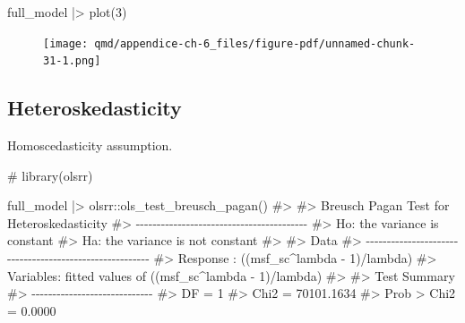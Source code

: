 \documentclass[
  12pt,
  a4paper,
  oneside]{tesesusp}
\newenvironment{Shaded}{\begin{snugshade}}{\end{snugshade}}
\newcommand{\CommentTok}[1]{\textcolor[rgb]{0.37,0.37,0.37}{#1}}
\newcommand{\DecValTok}[1]{\textcolor[rgb]{0.68,0.00,0.00}{#1}}
\newcommand{\FunctionTok}[1]{\textcolor[rgb]{0.28,0.35,0.67}{#1}}
\newcommand{\NormalTok}[1]{\textcolor[rgb]{0.00,0.23,0.31}{#1}}
\newcommand{\SpecialCharTok}[1]{\textcolor[rgb]{0.37,0.37,0.37}{#1}}
\begin{document}
\begin{Shaded}
\begin{Highlighting}[numbers=left,,]
\NormalTok{full\_model }\SpecialCharTok{|\textgreater{}} \FunctionTok{plot}\NormalTok{(}\DecValTok{3}\NormalTok{)}
\end{Highlighting}
\end{Shaded}

\begin{figure}[H]

{\centering \texttt{[image: qmd/appendice-ch-6\_files/figure-pdf/unnamed-chunk-31-1.png]}

}

\end{figure}

\hypertarget{heteroskedasticity-1}{%
\subsection{Heteroskedasticity}\label{heteroskedasticity-1}}

Homoscedasticity assumption.

\begin{Shaded}
\begin{Highlighting}[numbers=left,,]
\CommentTok{\# library(olsrr)}

\NormalTok{full\_model }\SpecialCharTok{|\textgreater{}}\NormalTok{ olsrr}\SpecialCharTok{::}\FunctionTok{ols\_test\_breusch\_pagan}\NormalTok{()}
\CommentTok{\#\textgreater{} }
\CommentTok{\#\textgreater{}  Breusch Pagan Test for Heteroskedasticity}
\CommentTok{\#\textgreater{}  {-}{-}{-}{-}{-}{-}{-}{-}{-}{-}{-}{-}{-}{-}{-}{-}{-}{-}{-}{-}{-}{-}{-}{-}{-}{-}{-}{-}{-}{-}{-}{-}{-}{-}{-}{-}{-}{-}{-}{-}{-}}
\CommentTok{\#\textgreater{}  Ho: the variance is constant            }
\CommentTok{\#\textgreater{}  Ha: the variance is not constant        }
\CommentTok{\#\textgreater{} }
\CommentTok{\#\textgreater{}                           Data                           }
\CommentTok{\#\textgreater{}  {-}{-}{-}{-}{-}{-}{-}{-}{-}{-}{-}{-}{-}{-}{-}{-}{-}{-}{-}{-}{-}{-}{-}{-}{-}{-}{-}{-}{-}{-}{-}{-}{-}{-}{-}{-}{-}{-}{-}{-}{-}{-}{-}{-}{-}{-}{-}{-}{-}{-}{-}{-}{-}{-}{-}{-}}
\CommentTok{\#\textgreater{}  Response : ((msf\_sc\^{}lambda {-} 1)/lambda) }
\CommentTok{\#\textgreater{}  Variables: fitted values of ((msf\_sc\^{}lambda {-} 1)/lambda) }
\CommentTok{\#\textgreater{} }
\CommentTok{\#\textgreater{}         Test Summary          }
\CommentTok{\#\textgreater{}  {-}{-}{-}{-}{-}{-}{-}{-}{-}{-}{-}{-}{-}{-}{-}{-}{-}{-}{-}{-}{-}{-}{-}{-}{-}{-}{-}{-}{-}}
\CommentTok{\#\textgreater{}  DF            =    1 }
\CommentTok{\#\textgreater{}  Chi2          =    70101.1634 }
\CommentTok{\#\textgreater{}  Prob \textgreater{} Chi2   =    0.0000}
\end{Highlighting}
\end{Shaded}
\end{document}

